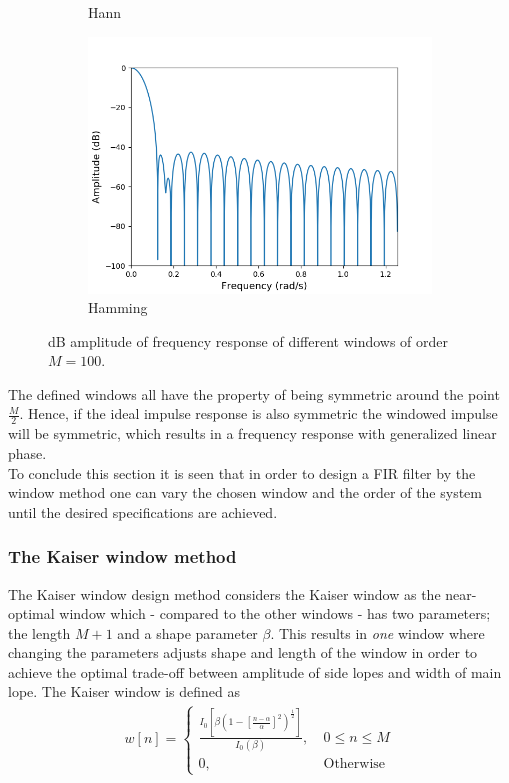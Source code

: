 \begin{figure}
\begin{subfigure}{0.49\textwidth}
\caption{Hann}
\label{fig:hann_db}
\includegraphics[width=\textwidth]{figures/dbplots/hamming.png}
\caption{Hamming}
\label{fig:hamming_db}
\end{subfigure}
\caption{dB amplitude of frequency response of different windows of order $M=100$.}
\label{fig:windows_db}
\end{figure}



The defined windows all have the property of being symmetric around the point $\frac{M}{2}$. Hence, if the ideal impulse response is also symmetric the windowed impulse will be symmetric, which results in a frequency response with generalized linear phase. \\
To conclude this section it is seen that in order to design a FIR filter by the window method one can vary the chosen window and the order of the system until the desired specifications are achieved.

\subsubsection{The Kaiser window method}
The Kaiser window design method considers the Kaiser window as the near-optimal window which - compared to the other windows - has two parameters; the length $M+1$ and a shape parameter $\beta$. This results in \textit{one} window where changing the parameters adjusts shape and length of the window in order to achieve the optimal trade-off between amplitude of side lopes and width of main lope. The Kaiser window is defined as 
\begin{align}
w[n]=\left\{\begin{matrix}
 \frac{I_0[\beta (1-[\frac{n-\alpha}{\alpha}]^2)^{\frac{1}{2}}]}{I_0(\beta)} , &\ 0 \leq n \leq M  \\ 
0, &\ \text{Otherwise}
\end{matrix}\right.
\end{align}

